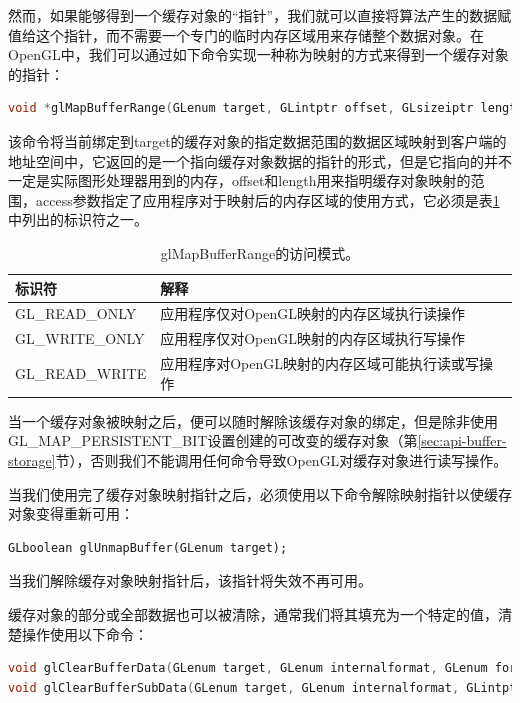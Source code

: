 然而，如果能够得到一个缓存对象的“指针”，我们就可以直接将算法产生的数据赋值给这个指针，而不需要一个专门的临时内存区域用来存储整个数据对象。在OpenGL中，我们可以通过如下命令实现一种称为映射的方式来得到一个缓存对象的指针：

\begin{lstlisting}[language=C++]
void *glMapBufferRange​(GLenum target​, GLintptr offset​, GLsizeiptr length​, GLbitfield access​);
\end{lstlisting}

该命令将当前绑定到target的缓存对象的指定数据范围的数据区域映射到客户端的地址空间中，它返回的是一个指向缓存对象数据的指针的形式，但是它指向的并不一定是实际图形处理器用到的内存，offset和length用来指明缓存对象映射的范围，access参数指定了应用程序对于映射后的内存区域的使用方式，它必须是表\ref{t:api-glMapBufferRange-access}中列出的标识符之一。

\begin{table}
\caption{glMapBufferRange的访问模式。}
\label{t:api-glMapBufferRange-access}
\centering
\begin{tabular}{>{\small}p{}|>{\small}p{}}
\hline 
   标识符 & 解释   \\
    \hline  
  GL\_READ\_ONLY    &应用程序仅对OpenGL映射的内存区域执行读操作 \\
  GL\_WRITE\_ONLY   &应用程序仅对OpenGL映射的内存区域执行写操作 \\
  GL\_READ\_WRITE   &应用程序对OpenGL映射的内存区域可能执行读或写操作 \\

 \hline 
\end{tabular}
\end{table}

当一个缓存对象被映射之后，便可以随时解除该缓存对象的绑定，但是除非使用GL\_MAP\_PERSISTENT\_BIT设置创建的可改变的缓存对象（第\ref{sec:api-buffer-storage}节），否则我们不能调用任何命令导致OpenGL对缓存对象进行读写操作。

当我们使用完了缓存对象映射指针之后，必须使用以下命令解除映射指针以使缓存对象变得重新可用：

\begin{lstlisting}
GLboolean glUnmapBuffer(GLenum target​);
\end{lstlisting}

当我们解除缓存对象映射指针后，该指针将失效不再可用。

缓存对象的部分或全部数据也可以被清除，通常我们将其填充为一个特定的值，清楚操作使用以下命令：

\begin{lstlisting}[language=C++]
void glClearBufferData​(GLenum target​​, GLenum internalformat​, GLenum format​, GLenum type​, const void * data​);
void glClearBufferSubData​(GLenum target​, GLenum internalformat​, GLintptr offset​, GLsizeiptr size​, GLenum format​, GLenum type​, const void * data​);
\end{lstlisting}

